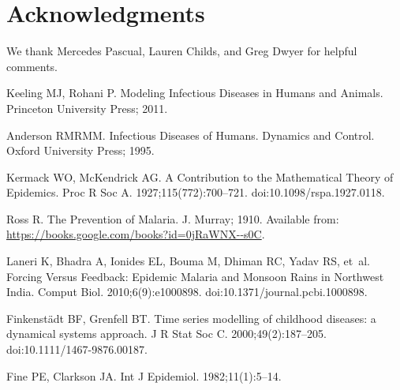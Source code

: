 \documentclass[10pt,letterpaper]{article}
\begin{document}
\section*{Acknowledgments}
We thank Mercedes Pascual, Lauren Childs, and Greg Dwyer for helpful comments.


\nolinenumbers

%
%
% 

\begin{thebibliography}{10}

Keeling MJ, Rohani P.
\newblock Modeling Infectious Diseases in Humans and Animals.
\newblock Princeton University Press; 2011.

Anderson RMRMM.
\newblock Infectious Diseases of Humans. Dynamics and Control.
\newblock Oxford University Press; 1995.

Kermack WO, McKendrick AG.
\newblock A Contribution to the Mathematical Theory of Epidemics.
\newblock Proc R Soc A. 1927;115(772):700--721.
\newblock doi:{10.1098/rspa.1927.0118}.

Ross R.
\newblock The Prevention of Malaria.
\newblock J. Murray; 1910.
\newblock Available from: \url{https://books.google.com/books?id=0jRaWNX--s0C}.

Laneri K, Bhadra A, Ionides EL, Bouma M, Dhiman RC, Yadav RS, et~al.
\newblock Forcing Versus Feedback: Epidemic Malaria and Monsoon Rains in
  Northwest {India}.
 Comput Biol. 2010;6(9):e1000898.
\newblock doi:{10.1371/journal.pcbi.1000898}.

Finkenst\"{a}dt BF, Grenfell BT.
\newblock Time series modelling of childhood diseases: a dynamical systems
  approach.
\newblock J R Stat Soc C. 2000;49(2):187--205.
\newblock doi:{10.1111/1467-9876.00187}.

Fine PE, Clarkson JA.
\newblock Int J Epidemiol. 1982;11(1):5--14.


\end{thebibliography}
\end{document}
